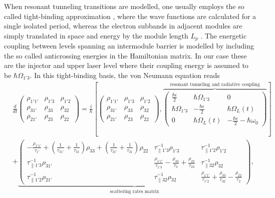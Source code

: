 \documentclass[twocolumn,secnumarabic,amssymb, nobibnotes, aps, prd]{revtex4-1}
\begin{document}
When resonant tunneling transitions are modelled, one usually employs the so called tight-binding approximation \cite{bastardwave}, where the wave functions are calculated for a single isolated period, whereas the electron subbands in adjacent modules are simply translated in space and energy by the module length $L_p$ \cite{callebaut2005importance}. The energetic coupling between levels spanning an intermodule barrier is modelled by including the so called anticrossing energies in the Hamiltonian matrix. In our case these are the injector and upper laser level where their coupling energy is assumed to be $\hbar \Omega_{1'3}$. In this tight-binding basis, the von Neumann equation reads
\begin{align}
\label{eq:vonNeumannmatrix}
& \frac{d}{dt} \begin{pmatrix}
\rho_{1'1'}& \rho_{1'3} & \rho_{1'2} \\
\rho_{31'} & \rho_{33} & \rho_{32} \\ 
\rho_{21'} & \rho_{23} & \rho_{22}
\end{pmatrix}  =   \frac{i}{\hbar}\left [
\begin{pmatrix}
\rho_{1'1'}& \rho_{1'3} & \rho_{1'2} \\
\rho_{31'} & \rho_{33} & \rho_{32} \\ 
\rho_{21'} & \rho_{23} & \rho_{22}
\end{pmatrix} , 
\overbrace{\begin{pmatrix} 
	\frac{\hbar \epsilon}{2} & \hbar\Omega_{1'3} & 0 \\
	\hbar\Omega_{1'3}  & -\frac{\hbar	\epsilon}{2} &  \hbar\Omega_{L}(t) \\
	0  &\hbar\Omega_{L}(t) & -\frac{\hbar \epsilon}{2}-\hbar\omega_{0}   
	\end{pmatrix} }^{\text{resonant tunneling and radiative coupling}}
\right ]  \nonumber \\
& + 
\underbrace{\begin{pmatrix}
	-\frac{\rho_{1'1'}}{\tau_{1'}} + (\frac{1}{\tau_{31'}}+\frac{1}{\tau_{31}})\rho_{33}  +  (\frac{1}{\tau_{21'}}+\frac{1}{\tau_{21}})\rho_{22} & \tau_{\parallel 1'3}^{-1}\rho_{1'3} & \tau_{\parallel 1'2}^{-1}\rho_{1'2}\\
	\tau_{\parallel 1'3}^{-1}\rho_{31'} & \frac{\rho_{1'1'}}{\tau_{1'3}}   - \frac{\rho_{33}}{\tau_{3}} +  \frac{\rho_{22}}{\tau_{23}} &  \tau_{\parallel 32}^{-1}\rho_{32}\\
	\tau_{\parallel 1'2}^{-1}\rho_{21'}& \tau_{\parallel 32}^{-1}\rho_{32} &	\frac{ \rho_{1'1'}}{\tau_{1'2}} + \frac{\rho_{33} }{\tau_{32}} 	- \frac{\rho_{22}}{\tau_2}
	\end{pmatrix}}_{\text{scattering rates matrix}},
\end{align}
\end{document}
